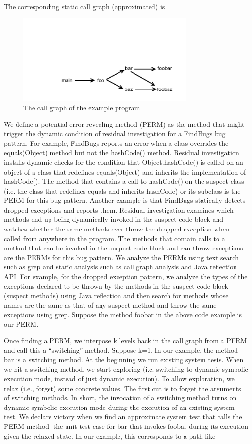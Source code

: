 \documentclass[proposal]{umthesis} %
\begin{document}
The corresponding static call graph (approximated) is
\begin{figure}[h]
\centering
\includegraphics[width=3.5in, trim=0.8in 0in 0in 1.0in, clip]{callgraph.png}
\caption{The call graph of the example program}
\end{figure}

We define a potential error revealing method (PERM) as the method that might trigger the dynamic condition of residual investigation for a FindBugs bug pattern.  For example, FindBugs reports an error when a class overrides the equals(Object) method but not the hashCode() method.  Residual investigation installs dynamic checks for the condition that Object.hashCode() is called on an object of a class that redefines equals(Object) and inherits the implementation of hashCode(). The method that contains a call to hashCode() on the suspect class (i.e. the class that redefines equals and inherits hashCode) or its subclass is the PERM for this bug pattern.  Another example is that FindBugs statically detects dropped exceptions and reports them.  Residual investigation examines which methods end up being dynamically invoked in the suspect code block and watches whether the same methods ever throw the dropped exception when called from anywhere in the program. The methods that contain calls to a method that can be invoked in the suspect code block and can throw exceptions are the PERMs for this bug pattern. We analyze the PERMs using text search such as grep and static analysis such as call graph analysis and Java reflection API.  For example, for the dropped exception pattern, we analyze the types of the exceptions declared to be thrown by the methods in the suspect code block (suspect methods) using Java reflection and then search for methods whose names are the same as that of any suspect method and throw the same exceptions using grep.  Suppose the method foobar in the above code example is our PERM.  

Once finding a PERM, we interpose k levels back in the call graph from a PERM and call this a “switching” method.  Suppose k=1. In our example, the method bar is a switching method.  At the beginning we run existing system tests.  When we hit a switching method, we start exploring (i.e. switching to dynamic symbolic execution mode, instead of just dynamic execution).  To allow exploration, we relax (i.e., forget) some concrete values.  The first cut is to forget the arguments of switching methods.  In short, the invocation of a switching method turns on dynamic symbolic execution mode during the execution of an existing system test.  We declare victory when we find an approximate system test that calls the PERM method: the unit test case for bar that invokes foobar during its execution given the relaxed state.  In our example, this corresponds to a path like 
\end{document}
